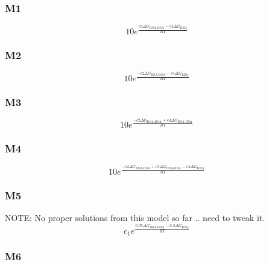 \documentclass[a4paper]{article}
\begin{document}

\subsubsection{M1}
\begin{equation*}
	10e^{\frac{c3\Delta G_{\text{DNA-DNA}} - c4\Delta G_{\text{KEQ}}}{RT}}
\end{equation*}

\subsubsection{M2}

\begin{equation*}
	10e^{\frac{-c2\Delta G_{\text{RNA-DNA}} - c4\Delta G_{\text{KEQ}}}{RT}}
\end{equation*}

\subsubsection{M3}

\begin{equation*}
	10e^{\frac{-c2\Delta G_{\text{RNA-DNA}} + c3\Delta
		G_{\text{DNA-DNA}}}{RT}}
\end{equation*}

\subsubsection{M4}

\begin{equation*}
	10e^{\frac{-c2\Delta G_{\text{RNA-DNA}} + c3\Delta
		G_{\text{DNA-DNA}} - c4\Delta G_{\text{KEQ}}}{RT}}
\end{equation*}

\subsubsection{M5}

NOTE: No proper solutions from this model so far .. need to tweak it.
\begin{equation*}
	c_1e^{\frac{0.05\Delta G_{\text{DNA-DNA}} - 0.2\Delta G_{\text{KEQ}}}{RT}}
\end{equation*}

\subsubsection{M6}
\end{document}
